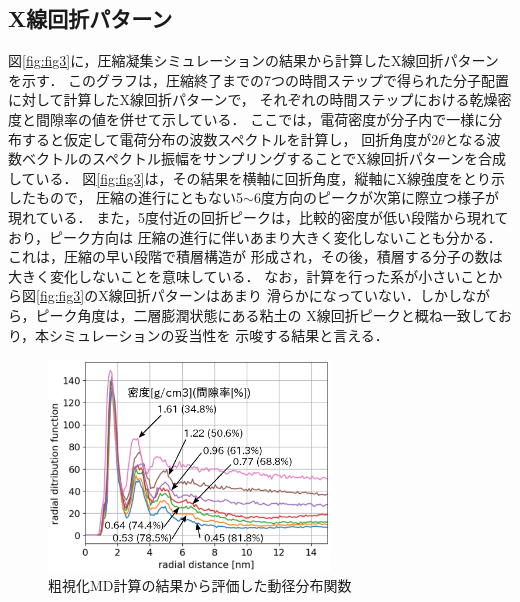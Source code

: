 ﻿\documentclass[11pt,a4j]{jarticle}
\begin{document}
\subsection{X線回折パターン}
図\ref{fig:fig3}に，圧縮凝集シミュレーションの結果から計算したX線回折パターンを示す．
このグラフは，圧縮終了までの7つの時間ステップで得られた分子配置に対して計算したX線回折パターンで，
それぞれの時間ステップにおける乾燥密度と間隙率の値を併せて示している．
ここでは，電荷密度が分子内で一様に分布すると仮定して電荷分布の波数スペクトルを計算し，
回折角度が$2\theta$となる波数ベクトルのスペクトル振幅をサンプリングすることでX線回折パターンを合成している．
図\ref{fig:fig3}は，その結果を横軸に回折角度，縦軸にX線強度をとり示したもので，
圧縮の進行にともない5$\sim$6度方向のピークが次第に際立つ様子が現れている．
また，5度付近の回折ピークは，比較的密度が低い段階から現れており，ピーク方向は
圧縮の進行に伴いあまり大きく変化しないことも分かる．これは，圧縮の早い段階で積層構造が
形成され，その後，積層する分子の数は大きく変化しないことを意味している．
なお，計算を行った系が小さいことから図\ref{fig:fig3}のX線回折パターンはあまり
滑らかになっていない．しかしながら，ピーク角度は，二層膨潤状態にある粘土の
X線回折ピークと概ね一致しており\cite{Morodome}，本シミュレーションの妥当性を
示唆する結果と言える．
\vspace{-6mm}
\begin{figure}
	\centering
	\vspace{-5mm}
	\includegraphics[keepaspectratio,width=75mm]{Figs/rdfs.eps}
	\vspace{-5mm}
	\caption{粗視化MD計算の結果から評価した動径分布関数}
	\label{fig:fig4}
\end{figure}
\end{document}

